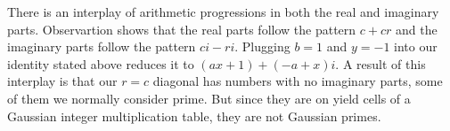 \documentclass[12pt]{article}
\begin{document}
There is an interplay of arithmetic progressions in both the real and imaginary parts. Observartion shows that the real parts follow the pattern $c + cr$ and the imaginary parts follow the pattern $ci - ri$. Plugging $b = 1$ and $y = -1$ into our identity stated above reduces it to $(ax + 1) + (-a + x)i$. A result of this interplay is that our $r = c$ diagonal has numbers with no imaginary parts, some of them we normally consider prime. But since they are on yield cells of a Gaussian integer multiplication table, they are not Gaussian primes.
\end{document}
